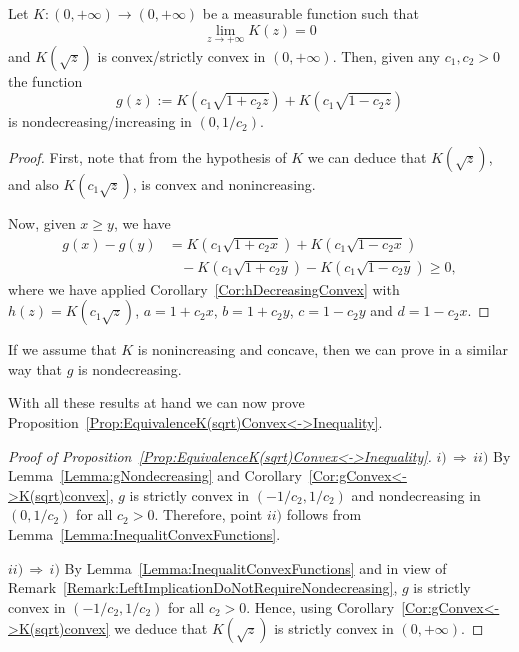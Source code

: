 \begin{lemma}
\label{Lemma:gNondecreasing}
Let $K:(0,+\infty) \to (0,+\infty)$ be a measurable function such that
$$ \lim_{z\to+\infty} K(z) = 0 $$
and $ K(\sqrt{z}) $ is convex/strictly convex in $(0,+\infty)$. Then, given any $c_1,c_2>0$ the
function
$$
g(z) := K(c_1 \sqrt{1 + c_2 z}) +  K(c_1 \sqrt{1 - c_2 z})
$$
is nondecreasing/increasing in $(0, 1/c_2)$.
\end{lemma}

\begin{proof}
First, note that from the hypothesis of $K$ we can deduce that $K(\sqrt{z})$, and also
$K(c_1\sqrt{z})$, is convex and nonincreasing.

Now, given $x\geq y$, we have
\begin{align*}
g(x)-g(y) &= K(c_1\sqrt{1+c_2 x}) + K(c_1\sqrt{1-c_2 x}) \\
&\ \ \ \ - K(c_1\sqrt{1+c_2 y}) -K(c_1\sqrt{1-c_2 y}) \geq 0,
\end{align*}
where we have applied Corollary~\ref{Cor:hDecreasingConvex} with $h(z) = K(c_1\sqrt{z})$,
$a=1+c_2x$, $b=1+c_2y$, $c=1-c_2y$ and $d=1-c_2x$.
\end{proof}

\begin{remark}
	\label{Remark:Concavity}
If we assume that $K$ is nonincreasing and concave, then we can prove in a similar way that $g$ is
nondecreasing.
\end{remark}

With all these results at hand we can now prove Proposition~\ref{Prop:EquivalenceK(sqrt)Convex<->Inequality}.

\begin{proof}[Proof of Proposition~\ref{Prop:EquivalenceK(sqrt)Convex<->Inequality}]
$i)\, \Rightarrow \,ii)$ By Lemma~\ref{Lemma:gNondecreasing} and
Corollary~\ref{Cor:gConvex<->K(sqrt)convex}, $g$ is strictly convex in
$(-1/c_2,1/c_2)$ and nondecreasing in $(0,1/c_2)$ for all $c_2>0$. Therefore, point $ii)$ follows from
Lemma~\ref{Lemma:InequalitConvexFunctions}.

$ii)\, \Rightarrow \,i)$ By Lemma~\ref{Lemma:InequalitConvexFunctions} and in view of
Remark~\ref{Remark:LeftImplicationDoNotRequireNondecreasing}, $g$ is strictly convex in
$(-1/c_2,1/c_2)$ for all $c_2>0$. Hence, using Corollary~\ref{Cor:gConvex<->K(sqrt)convex} we deduce
that $K(\sqrt{z})$ is strictly convex in $(0, +\infty)$.
\end{proof}


